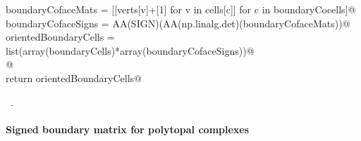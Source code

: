 \documentclass[11pt,oneside]{article}    %
\begin{document}
\begin{flushleft}
\begin{list}{}{}
\mbox{}\verb@    boundaryCofaceMats = [[verts[v]+[1] for v in cells[c]] for c in boundaryCocells]@\\
\mbox{}\verb@    boundaryCofaceSigns = AA(SIGN)(AA(np.linalg.det)(boundaryCofaceMats))@\\
\mbox{}\verb@    orientedBoundaryCells = list(array(boundaryCells)*array(boundaryCofaceSigns))@\\
\mbox{}\verb@    @\\
\mbox{}\verb@    return orientedBoundaryCells@\\
\mbox{}\verb@@{\NWsep}
\end{list}
\vspace{-1ex}
\footnotesize\addtolength{\baselineskip}{-1ex}
\begin{list}{}{\setlength{\itemsep}{-\parsep}\setlength{\itemindent}{-\leftmargin}}
\item \NWtxtMacroRefIn\ .
\end{list}
\end{flushleft}

\paragraph{Signed boundary matrix for polytopal complexes}
\end{document}
